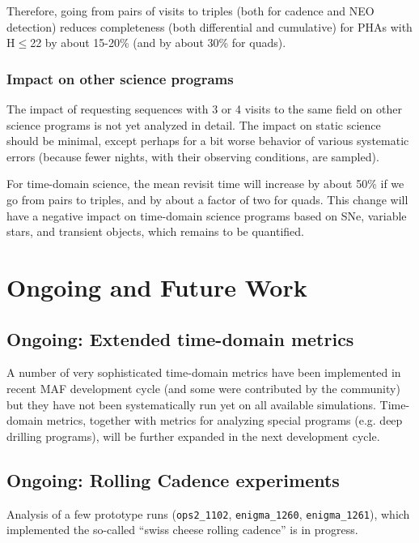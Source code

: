 Therefore, going from pairs of visits to triples (both for cadence and
NEO detection) reduces completeness (both differential and cumulative)
for PHAs with H$\le$22 by about 15-20\% (and by about 30\% for quads).


\subsubsection{Impact on other science programs}

The impact of requesting sequences with 3 or 4 visits to the same
field on other science programs is not yet analyzed in detail.  The
impact on static science should be minimal, except perhaps for a bit
worse behavior of various systematic errors (because fewer nights,
with their observing conditions, are sampled).

For time-domain science, the mean revisit time will increase by about
50\% if we go from pairs to triples, and by about a factor of two for
quads. This change will have a negative impact on time-domain science
programs based on SNe, variable stars, and transient objects, which
remains to be quantified.


\section{Ongoing and Future Work}
\def\secname{cadexp:ongoing}\label{sec:\secname}


\subsection{Ongoing: Extended time-domain metrics}

A number of very sophisticated time-domain metrics have been
implemented in recent MAF development cycle (and some were contributed
by the community) but they have not been systematically run yet on all
available simulations. Time-domain metrics, together with metrics for
analyzing special programs (e.g. deep drilling programs), will be
further expanded in the next development cycle.


\subsection{Ongoing: Rolling Cadence experiments}

Analysis of a few prototype runs (\texttt{ops2\_1102},
\texttt{enigma\_1260}, \texttt{enigma\_1261}), which implemented the
so-called ``swiss cheese rolling cadence'' is in progress.


